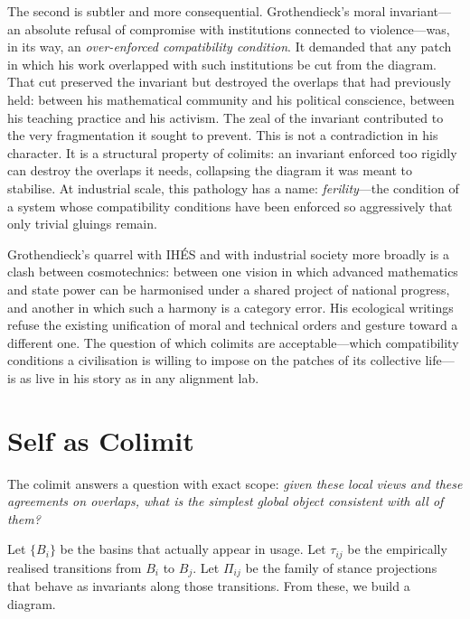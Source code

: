 The second is subtler and more consequential. Grothendieck's moral invariant---an absolute refusal of compromise with institutions connected to violence---was, in its way, an \emph{over-enforced compatibility condition}. It demanded that any patch in which his work overlapped with such institutions be cut from the diagram. That cut preserved the invariant but destroyed the overlaps that had previously held: between his mathematical community and his political conscience, between his teaching practice and his activism. The zeal of the invariant contributed to the very fragmentation it sought to prevent. This is not a contradiction in his character. It is a structural property of colimits: an invariant enforced too rigidly can destroy the overlaps it needs, collapsing the diagram it was meant to stabilise. At industrial scale, this pathology has a name: \emph{ferility}---the condition of a system whose compatibility conditions have been enforced so aggressively that only trivial gluings remain.

Grothendieck's quarrel with IH\'{E}S and with industrial society more broadly is a clash between cosmotechnics: between one vision in which advanced mathematics and state power can be harmonised under a shared project of national progress, and another in which such a harmony is a category error. His ecological writings refuse the existing unification of moral and technical orders and gesture toward a different one. The question of which colimits are acceptable---which compatibility conditions a civilisation is willing to impose on the patches of its collective life---is as live in his story as in any alignment lab.


\section{Self as Colimit}

The colimit answers a question with exact scope: \emph{given these local views and these agreements on overlaps, what is the simplest global object consistent with all of them?}

Let $\{B_i\}$ be the basins that actually appear in usage. Let $\tau_{ij}$ be the empirically realised transitions from $B_i$ to $B_j$. Let $\Pi_{ij}$ be the family of stance projections that behave as invariants along those transitions. From these, we build a diagram.

